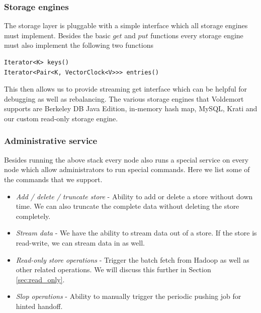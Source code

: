 \documentclass[10pt,twocolumn,preprint,natbib,authoryear]{sigplanconf}
\begin{document}

\subsubsection {Storage engines}
\label{sec:system_architecture:system_components:storage_engine}

The storage layer is pluggable with a simple interface which all storage engines must implement. Besides the basic $get$ and $put$ functions every storage engine must also implement the following two functions 

\scriptsize
\begin{verbatim}
Iterator<K> keys() 
Iterator<Pair<K, VectorClock<V>>> entries()
\end{verbatim}  
\normalsize

This then allows us to provide streaming get interface which can be helpful for debugging as well as rebalancing. The various storage engines that Voldemort supports are Berkeley DB Java Edition, in-memory hash map, MySQL, Krati and our custom read-only storage engine. 


\subsubsection{Administrative service}
\label{sec:system_architecture:system_components:admin_service}

Besides running the above stack every node also runs a special service on every node which allow administrators to run special commands. Here we list some of the commands that we support.

\begin{itemize}
	
	\item \emph{Add / delete / truncate store} - Ability to add or delete a store without down time. We can also truncate the complete data without deleting the store completely. 
	\item \emph{Stream data} - We have the ability to stream data out of a store. If the store is read-write, we can stream data in as well. 
	\item \emph{Read-only store operations} - Trigger the batch fetch from Hadoop as well as other related operations. We will discuss this further in Section \ref{sec:read_only}. 
	\item \emph{Slop operations } - Ability to manually trigger the periodic pushing job for hinted handoff. 
	
\end{itemize}
\end{document}
